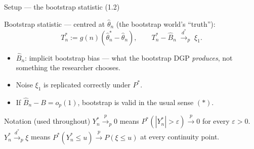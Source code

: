 \documentclass[10pt,aspectratio=169]{beamer}
\theoremstyle{plain}
\newcommand{\Pstar}{P^{*}}
\newcommand{\pto}{\xrightarrow{p}}
\newcommand{\dstarto}{\xrightarrow{d^{*}}}
\newcommand{\Tns}{T_{n}^{*}}
\newcommand{\Bnh}{\hat{B}_{n}}
\newcommand{\thn}{\hat{\theta}_{n}}
\newcommand{\thns}{\hat{\theta}_{n}^{*}}
\begin{document}

\begin{frame}{Setup --- the bootstrap statistic (1.2)}

  Bootstrap statistic --- centred at $\thn$ (the bootstrap world's ``truth''):
  \[
    \Tns := g(n)(\thns - \thn),
    \qquad
    \Tns - \Bnh \;\dstarto_p\; \xi_1.
    \tag{1.2}
  \]

  \medskip

  \begin{itemize}
    \setlength{\itemsep}{8pt}
    \item $\Bnh$: \alert{implicit} bootstrap bias --- what the bootstrap DGP \textit{produces},
      not something the researcher chooses.
    \item Noise $\xi_1$ is replicated correctly under $\Pstar$.
    \item If $\Bnh - B = o_p(1)$, bootstrap is valid in the usual sense $(\ast)$.
  \end{itemize}

  \medskip

  \begin{block}{Notation (used throughout)}
    \footnotesize
    $Y_n^* \pto_p 0$ means $\Pstar(|Y_n^*|>\varepsilon)\pto 0$ for every $\varepsilon>0$.\\
    $Y_n^* \dstarto_p \xi$ means $\Pstar(Y_n^*\le u)\pto P(\xi\le u)$ at every continuity point.
  \end{block}

\end{frame}

\end{document}
